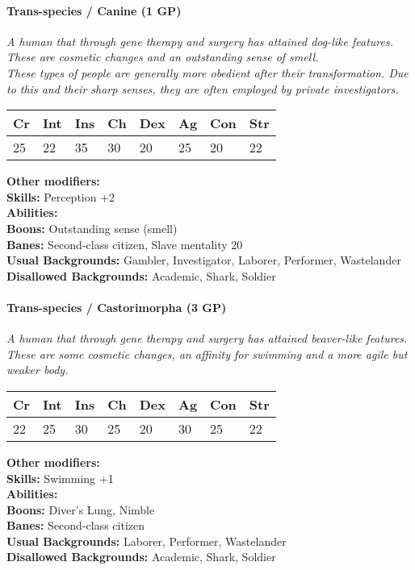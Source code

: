\hrulefill
\paragraph*{Trans-species / Canine (1 GP)}
\textit{A human that through gene therapy and surgery has attained dog-like features. These are cosmetic changes and an outstanding sense of smell.\\
	These types of people are generally more obedient after their transformation. Due to this and their sharp senses, they are often employed by private investigators.}\par
\begin{tabular}{|l|l|l|l|l|l|l|l|}
	\hline
	Cr & Int & Ins & Ch & Dex & Ag & Con & Str \\ \hline
	25 & 22 & 35 & 30 & 20 & 25 & 20 & 22 \\ \hline
\end{tabular}\par
\noindent\textbf{Other modifiers:} \\
\textbf{Skills:} Perception +2\\
\textbf{Abilities:} \\
\textbf{Boons:} Outstanding sense (smell)\\
\textbf{Banes:} Second-class citizen, Slave mentality 20\\
\textbf{Usual Backgrounds:} Gambler, Investigator, Laborer, Performer, Wastelander\\
\textbf{Disallowed Backgrounds:} Academic, Shark, Soldier

\hrulefill
\paragraph*{Trans-species / Castorimorpha (3 GP)}
\textit{A human that through gene therapy and surgery has attained beaver-like features. These are some cosmetic changes, an affinity for swimming and a more agile but weaker body.}\par
\begin{tabular}{|l|l|l|l|l|l|l|l|}
	\hline
	Cr & Int & Ins & Ch & Dex & Ag & Con & Str \\ \hline
	22 & 25 & 30 & 25 & 20 & 30 & 25 & 22 \\ \hline
\end{tabular}\par
\noindent\textbf{Other modifiers:} \\
\textbf{Skills:} Swimming +1\\
\textbf{Abilities:} \\
\textbf{Boons:} Diver's Lung, Nimble\\
\textbf{Banes:} Second-class citizen\\
\textbf{Usual Backgrounds:} Laborer, Performer, Wastelander\\
\textbf{Disallowed Backgrounds:} Academic, Shark, Soldier

